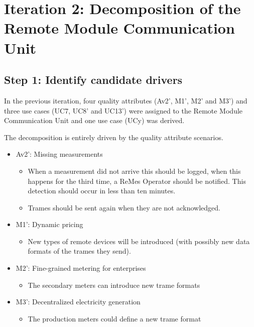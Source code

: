 \section{Iteration 2: Decomposition of the Remote Module Communication Unit}
\label{add:it2}

\subsection{Step 1: Identify candidate drivers}
\label{add:it2/drivers}

\npar In the previous iteration, four quality attributes (Av2', M1', M2' and
M3') and three use cases (UC7, UC8' and UC13') were assigned to the Remote
Module Communication Unit and one use case (UCy) was derived. 

\npar The decomposition is entirely driven by the quality attribute scenarios. 

\begin{itemize}
  	\item Av2': Missing measurements
  	\begin{itemize}
    	\item When a measurement did not arrive this should be logged, when
  		this happens for the third time, a ReMes Operator should be notified. This
  		detection should occur in less than ten minutes.
		\item Trames should be sent again when they are not acknowledged.
  	\end{itemize}
  	\item M1': Dynamic pricing
  	\begin{itemize}
    	\item New types of remote devices will be introduced (with possibly new
    	data formats of the trames they send).
  	\end{itemize}
  	\item M2': Fine-grained metering for enterprises
  	\begin{itemize}
    	\item The secondary meters can introduce new trame formats
  	\end{itemize}
  	\item M3': Decentralized electricity generation
  	\begin{itemize}
   		\item The production meters could define a new trame format
  	\end{itemize}
\end{itemize}

